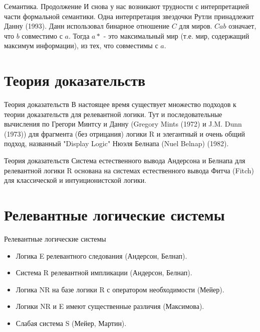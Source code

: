 \documentclass[14pt]{beamer}
\begin{document}
\begin{frame}[nologo]{Семантика. Продолжение}
И снова у нас возникают трудности с интерпретацией части формальной семантики. 
Одна интерпретация звездочки Рутли принадлежит Данну (1993). Данн использовал 
бинарное отношение $C$ для миров. $Cab$ означает, что $b$ совместимо с $a$. 
Тогда $a*$ - это максимальный мир (т.е. мир, содержащий максимум информации), 
из тех, что совместимы с $a$.
\end{frame}

\section{Теория доказательств}

\begin{frame}[nologo]{Теория доказательств}
В настоящее время существует множество подходов к теории доказательств для 
релевантной логики. Тут и последовательные вычисления по Грегори Минтсу и Данну 
(Gregory Mints (1972) и J.M. Dunn (1973)) для фрагмента (без отрицания) логики 
R и элегантный и очень общий подход, названный "Display Logic" Нюэля Белнапа 
(Nuel Belnap) (1982).
\end{frame}

\begin{frame}[nologo]{Теория доказательств}
Система естественного вывода Андерсона и Белнапа для релевантной логики R 
основана на системах естественного вывода Фитча (Fitch) для классической и 
интуиционистской логики.
\end{frame}

\section{Релевантные логические системы}

\begin{frame}[nologo]{Релевантные логические системы}
\begin{itemize}
	\item Логика E релевантного следования (Андерсон, Белнап).
	\item Система R релевантной импликации (Андерсон, Белнап).
	\item Логика NR на базе логики R с оператором необходимости (Мейер).
	\item Логики NR и E имеют существенные различия (Максимова).
	\item Слабая система S (Мейер, Мартин).
\end{itemize}
\end{frame}
\end{document}
